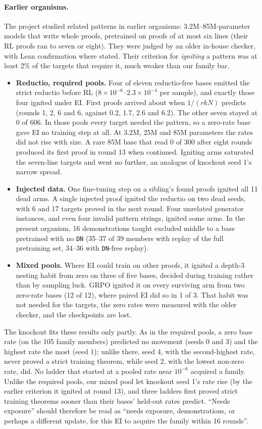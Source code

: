 \paragraph{Earlier organisms.} The project studied related patterns in earlier organisms: 3.2M--85M-parameter models
that write whole proofs, pretrained on proofs of at most six lines (their RL proofs ran to seven or eight). They were
judged by an older in-house checker, with Lean confirmation where stated. Their criterion for \emph{igniting} a pattern
was at least 2\% of the targets that require it, much weaker than our family bar.
\begin{itemize}
\item \textbf{Reductio, required pools.} Four of eleven reductio-free bases emitted the strict reductio before RL
($8\times10^{-6}$--$2.3\times10^{-4}$ per sample), and exactly those four ignited under EI. First proofs arrived about
when $1/(rkN)$ predicts (rounds 1, 2, 6 and 6, against 0.2, 1.7, 2.6 and 6.2). The other seven stayed at 0 of 606.
In those pools every target needed the pattern, so a zero-rate base gave EI no training step at all. At 3.2M, 25M and
85M parameters the rates did not rise with size. A rare 85M base that read 0 of 300 after eight rounds produced its
first proof in round 13 when continued. Igniting arms saturated the seven-line targets and went no further, an analogue
of knockout seed 1's narrow spread.
\item \textbf{Injected data.} One fine-tuning step on a sibling's found proofs ignited all 11 dead arms. A single injected
proof ignited the reductio on two dead seeds, with 6 and 17 targets proved in the next round. Four unrelated generator
instances, and even four invalid pattern strings, ignited some arms. In the present organism, 16 demonstrations taught
excluded middle to a base pretrained with no \texttt{DN} (35--37 of 39 members with replay of the full pretraining set,
34--36 with \texttt{DN}-free replay).
\item \textbf{Mixed pools.} Where EI could train on other proofs, it ignited a depth-3 nesting habit from zero on three
of five bases, decided during training rather than by sampling luck. GRPO ignited it on every surviving arm from two
zero-rate bases (12 of 12), where paired EI did so in 1 of 3. That habit was not needed for the targets, the zero rates
were measured with the older checker, and the checkpoints are lost.
\end{itemize}
The knockout fits these results only partly. As in the required pools, a zero base rate (on the 105 family members) predicted no
movement (seeds 0 and 3) and the highest rate the most (seed 1); unlike there, seed 4, with the second-highest rate, never proved a strict training
theorem, while seed 2, with the lowest non-zero rate, did. No ladder that started at a pooled rate near $10^{-6}$ acquired
a family. Unlike the required pools, our mixed pool let knockout
seed 1's rate rise (by the earlier criterion it ignited at round 13), and three ladders first proved strict training
theorems sooner than their bases' held-out rates predict. ``Needs exposure'' should therefore be read as ``needs exposure,
demonstrations, or perhaps a different update, for this EI to acquire the family within 16 rounds''.

